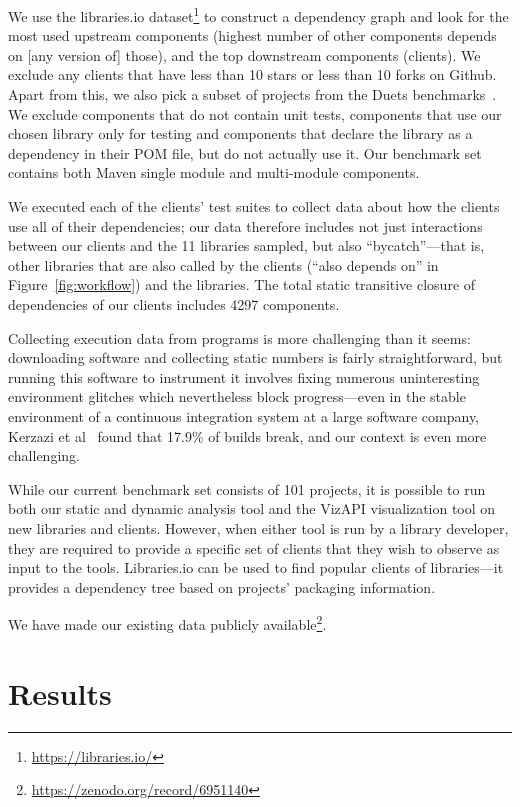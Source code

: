 We use the libraries.io dataset\footnote{\url{https://libraries.io/}} to construct a dependency graph and look for the most used upstream components (highest number of other components depends on [any version of] those), 
and the top downstream components (clients). We exclude any clients that have less than 10 stars or less than 10 forks on Github.  Apart from this, we also pick a subset of projects from the
Duets benchmarks~\cite{durieux21}. We exclude components that do not contain unit tests, components that use our chosen library only for testing
and components that declare the library as a dependency in their POM file, but do not actually use it. Our benchmark set contains both Maven single module and multi-module components.

We executed each of the clients' test suites to collect data about how the clients use all of their dependencies; our data therefore includes not just interactions between our clients and the 11 libraries sampled, but also ``bycatch''---that is, other libraries that are also called by the clients (``also depends on'' in Figure~\ref{fig:workflow}) and the libraries. The total static transitive closure of dependencies of our clients includes 4297 components.

Collecting execution data from programs is more challenging than it seems: downloading software and collecting static numbers is fairly straightforward, but running this software to instrument it involves fixing numerous uninteresting environment glitches which nevertheless block progress---even in the stable environment of a continuous integration system at a large software company, Kerzazi et al~\cite{kerzazi14:_why_do_autom_build_break} found that 17.9\% of builds break, and our context is even more challenging.

While our current benchmark set consists of 101 projects, it is possible to run both our static and dynamic analysis tool and the VizAPI visualization tool on new libraries and clients. However, when either tool is run by a library developer, they are required to provide a specific set of clients that they wish to observe as input to the tools. Libraries.io can be used to find popular clients of libraries---it provides a dependency tree based on projects' packaging information.

We have made our existing data publicly available\footnote{\url{https://zenodo.org/record/6951140}}.

\section{Results}
\label{sec:results}

